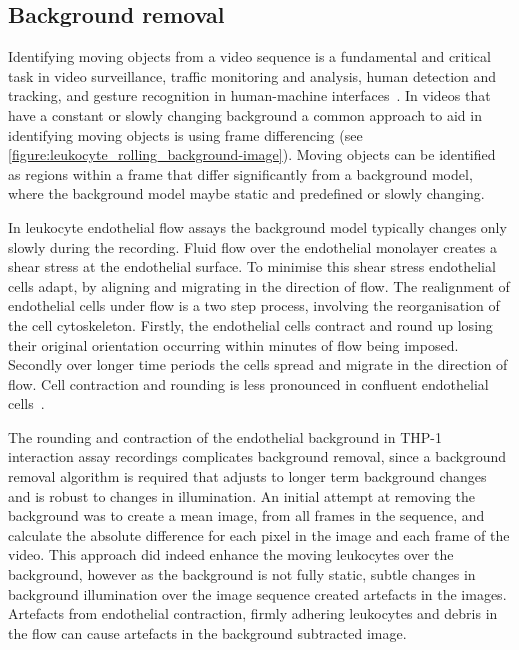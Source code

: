 \subsection{Background removal}
\label{leukocytes:processing:background}
Identifying moving objects from a video sequence is a fundamental and critical task in video surveillance, traffic monitoring and analysis, human detection and tracking, and gesture recognition in human-machine interfaces~\cite{Cheung2004}. In videos that have a constant or slowly changing background a common approach to aid in identifying moving objects is using frame differencing (see \autoref{figure:leukocyte_rolling_background-image}). Moving objects can be identified as regions within a frame that differ significantly from a background model, where the background model maybe static and predefined or slowly changing.

In leukocyte endothelial flow assays the background model typically changes only slowly during the recording. Fluid flow over the endothelial monolayer creates a shear stress at the endothelial surface. To minimise this shear stress endothelial cells adapt, by aligning and migrating in the direction of flow. The realignment of endothelial cells under flow is a two step process, involving the reorganisation of the cell cytoskeleton. Firstly, the endothelial cells contract and round up losing their original orientation occurring within minutes of flow being imposed. Secondly over longer time periods the cells spread and migrate in the direction of flow. Cell contraction and rounding is less pronounced in confluent endothelial cells~\cite{Wells2011}.

The rounding and contraction of the endothelial background in THP-1 interaction assay recordings complicates background removal, since a background removal algorithm is required that adjusts to longer term background changes and is robust to changes in illumination. An initial attempt at removing the background was to create a mean image, from all frames in the sequence, and calculate the absolute difference for each pixel in the image and each frame of the video. This approach did indeed enhance the moving leukocytes over the background, however as the background is not fully static, subtle changes in background illumination over the image sequence created artefacts in the images. Artefacts from endothelial contraction, firmly adhering leukocytes and debris in the flow can cause artefacts in the background subtracted image.

